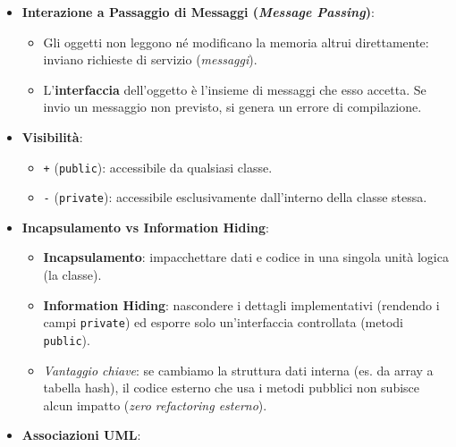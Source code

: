 \documentclass[11pt,a4paper]{article}
\newcommand{\passthrough}[1]{#1}
\providecommand{\tightlist}{\setlength{\itemsep}{0pt}\setlength{\parskip}{0pt}}
\begin{document}
\begin{itemize}
\begin{itemize}
    \begin{itemize}
    \tightlist
    \item
      Es. \passthrough{\lstinline!Car1: Car!} con
      \passthrough{\lstinline!manufacturer = DeLorean!},
      \passthrough{\lstinline!model = DMC-12!}.
    \end{itemize}
  \end{itemize}
\item
  \textbf{Interazione a Passaggio di Messaggi (\emph{Message Passing})}:

  \begin{itemize}
  \tightlist
  \item
    Gli oggetti non leggono né modificano la memoria altrui
    direttamente: inviano richieste di servizio (\emph{messaggi}).
  \item
    L'\textbf{interfaccia} dell'oggetto è l'insieme di messaggi che esso
    accetta. Se invio un messaggio non previsto, si genera un errore di
    compilazione.
  \end{itemize}
\item
  \textbf{Visibilità}:

  \begin{itemize}
  \tightlist
  \item
    \passthrough{\lstinline!+!} (\passthrough{\lstinline!public!}):
    accessibile da qualsiasi classe.
  \item
    \passthrough{\lstinline!-!} (\passthrough{\lstinline!private!}):
    accessibile esclusivamente dall'interno della classe stessa.
  \end{itemize}
\item
  \textbf{Incapsulamento vs Information Hiding}:

  \begin{itemize}
  \tightlist
  \item
    \textbf{Incapsulamento}: impacchettare dati e codice in una singola
    unità logica (la classe).
  \item
    \textbf{Information Hiding}: nascondere i dettagli implementativi
    (rendendo i campi \passthrough{\lstinline!private!}) ed esporre solo
    un'interfaccia controllata (metodi
    \passthrough{\lstinline!public!}).
  \item
    \emph{Vantaggio chiave}: se cambiamo la struttura dati interna (es.
    da array a tabella hash), il codice esterno che usa i metodi
    pubblici non subisce alcun impatto (\emph{zero refactoring
    esterno}).
  \end{itemize}
\item
  \textbf{Associazioni UML}:


\end{itemize}
\end{document}
